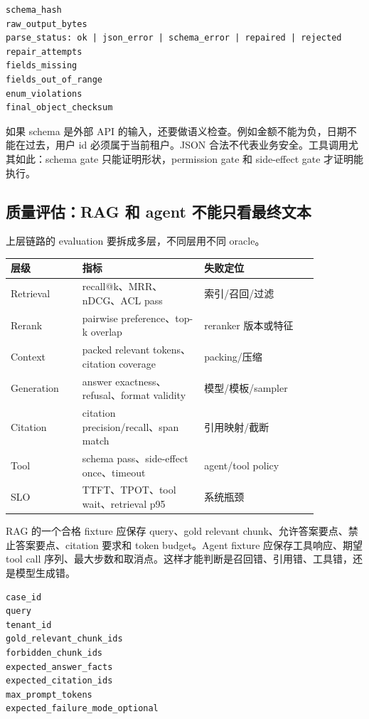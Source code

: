 \begin{lstlisting}[numbers=none,caption={StructuredOutputReport}]
schema_hash
raw_output_bytes
parse_status: ok | json_error | schema_error | repaired | rejected
repair_attempts
fields_missing
fields_out_of_range
enum_violations
final_object_checksum
\end{lstlisting}

如果 schema 是外部 API 的输入，还要做语义检查。例如金额不能为负，日期不能在过去，用户 id 必须属于当前租户。JSON 合法不代表业务安全。工具调用尤其如此：schema gate 只能证明形状，permission gate 和 side-effect gate 才证明能执行。

\subsection{质量评估：RAG 和 agent 不能只看最终文本}

上层链路的 evaluation 要拆成多层，不同层用不同 oracle。

\begin{center}
\small
\begin{tabular}{p{0.20\linewidth}p{0.34\linewidth}p{0.32\linewidth}}
\toprule
层级 & 指标 & 失败定位 \\
\midrule
Retrieval & recall@k、MRR、nDCG、ACL pass & 索引/召回/过滤 \\
Rerank & pairwise preference、top-k overlap & reranker 版本或特征 \\
Context & packed relevant tokens、citation coverage & packing/压缩 \\
Generation & answer exactness、refusal、format validity & 模型/模板/sampler \\
Citation & citation precision/recall、span match & 引用映射/截断 \\
Tool & schema pass、side-effect once、timeout & agent/tool policy \\
SLO & TTFT、TPOT、tool wait、retrieval p95 & 系统瓶颈 \\
\bottomrule
\end{tabular}
\end{center}

RAG 的一个合格 fixture 应保存 query、gold relevant chunk、允许答案要点、禁止答案要点、citation 要求和 token budget。Agent fixture 应保存工具响应、期望 tool call 序列、最大步数和取消点。这样才能判断是召回错、引用错、工具错，还是模型生成错。

\begin{lstlisting}[numbers=none,caption={RAGEvalCase}]
case_id
query
tenant_id
gold_relevant_chunk_ids
forbidden_chunk_ids
expected_answer_facts
expected_citation_ids
max_prompt_tokens
expected_failure_mode_optional
\end{lstlisting}

